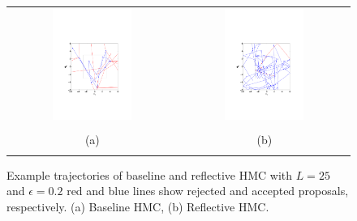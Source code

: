 \documentclass{article} %
\begin{document}
\begin{figure}
\setlength{\tabcolsep}{0em}
\vspace{-1mm}
\begin{center}
\begin{tabular}{cc}
\includegraphics[trim={3.2cm 6cm 3.2cm 9cm},clip,width=0.49\textwidth]{../plots3/BaselineHMC_l25_eps0_2_log_scatter2D.pdf} 
&\includegraphics[trim={3.2cm 6cm 3cm 9cm},clip,width=0.49\textwidth]{../plots3/ReflectiveHMC_l25_eps0_2_log_scatter2D.pdf}  \\
\vspace{-3.5mm}
\\
   \footnotesize(a) 
& \footnotesize(b) 
\\
\multicolumn{2}{c}{}
\end{tabular}
\end{center}
\vspace{-8mm}
\caption{\footnotesize
Example trajectories of baseline and reflective HMC with $L=25$ and $\epsilon=0.2$ red and blue lines show rejected and accepted proposals, respectively. (a) Baseline HMC, (b) Reflective HMC.}
\label{fig:sup.traj3}
\vspace{-10pt}
\end{figure}
\end{document}
